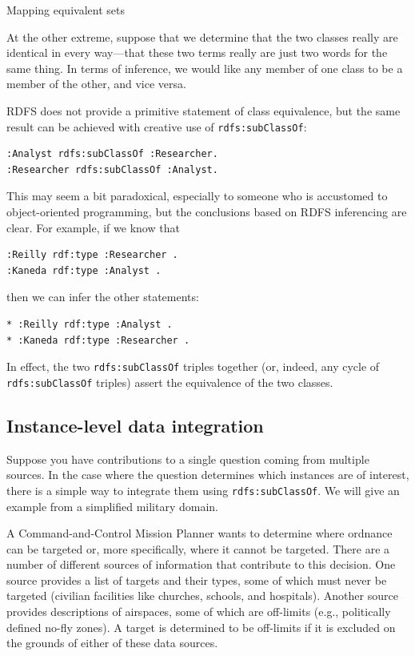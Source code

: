 \begin{challenge}{Mapping equivalent sets}
\label{chal:7}

At the other extreme, suppose that we determine that the two classes
really are identical in every way---that these two terms really are just
two words for the same thing. In terms of inference, we would like any
member of one class to be a member of the other, and vice versa.

\solution

RDFS does not provide a primitive statement of class equivalence, but
the same result can be achieved with creative use of \texttt{rdfs:subClassOf}:

\begin{lstlisting}
:Analyst rdfs:subClassOf :Researcher.
:Researcher rdfs:subClassOf :Analyst.
\end{lstlisting}

This may seem a bit paradoxical, especially to someone who is accustomed
to object-oriented programming, but the conclusions based on RDFS
inferencing are clear. For example, if we know that

\begin{lstlisting}
:Reilly rdf:type :Researcher .
:Kaneda rdf:type :Analyst .
\end{lstlisting}

then we can infer the other statements:

\begin{lstlisting}
* :Reilly rdf:type :Analyst .
* :Kaneda rdf:type :Researcher .
\end{lstlisting}

In effect, the two \texttt{rdfs:subClassOf} triples together (or, indeed, any
cycle of \texttt{rdfs:subClassOf} triples) assert the equivalence of the two
classes.
\end{challenge}

\subsection{Instance-level data integration}

Suppose you have contributions to a single question coming from multiple
sources. In the case where the question determines which instances are
of interest, there is a simple way to integrate them using
\texttt{rdfs:subClassOf}. We will give an example from a simplified military
domain.

A Command-and-Control Mission Planner wants to determine where ordnance
can be targeted or, more specifically, where it cannot be targeted.
There are a number of different sources of information that contribute
to this decision. One source provides a list of targets and their types,
some of which must never be targeted (civilian facilities like churches,
schools, and hospitals). Another source provides descriptions of
airspaces, some of which are off-limits (e.g., politically defined
no-fly zones). A target is determined to be off-limits if it is excluded
on the grounds of either of these data sources.

